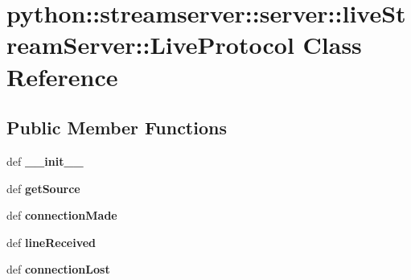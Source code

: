 \hypertarget{classpython_1_1streamserver_1_1server_1_1liveStreamServer_1_1LiveProtocol}{
\section{python::streamserver::server::liveStreamServer::LiveProtocol Class Reference}
\label{classpython_1_1streamserver_1_1server_1_1liveStreamServer_1_1LiveProtocol}
}
\subsection*{Public Member Functions}
\begin{DoxyCompactItemize}
\item 
\hypertarget{classpython_1_1streamserver_1_1server_1_1liveStreamServer_1_1LiveProtocol_a70114a4d7d6387a741fd0b2263705044}{
def {\bfseries \_\-\_\-init\_\-\_\-}}
\label{classpython_1_1streamserver_1_1server_1_1liveStreamServer_1_1LiveProtocol_a70114a4d7d6387a741fd0b2263705044}

\item 
\hypertarget{classpython_1_1streamserver_1_1server_1_1liveStreamServer_1_1LiveProtocol_aba2235e748d6a4ebf7fedcd45e5ad24d}{
def {\bfseries getSource}}
\label{classpython_1_1streamserver_1_1server_1_1liveStreamServer_1_1LiveProtocol_aba2235e748d6a4ebf7fedcd45e5ad24d}

\item 
\hypertarget{classpython_1_1streamserver_1_1server_1_1liveStreamServer_1_1LiveProtocol_a7bbb23a4a4a84fdd17c85dbdb24d9774}{
def {\bfseries connectionMade}}
\label{classpython_1_1streamserver_1_1server_1_1liveStreamServer_1_1LiveProtocol_a7bbb23a4a4a84fdd17c85dbdb24d9774}

\item 
\hypertarget{classpython_1_1streamserver_1_1server_1_1liveStreamServer_1_1LiveProtocol_a320597763f8fda88b5bf946d2a536a3d}{
def {\bfseries lineReceived}}
\label{classpython_1_1streamserver_1_1server_1_1liveStreamServer_1_1LiveProtocol_a320597763f8fda88b5bf946d2a536a3d}

\item 
\hypertarget{classpython_1_1streamserver_1_1server_1_1liveStreamServer_1_1LiveProtocol_ab6e5d4cff0750188eca6d5a2aeff0b8f}{
def {\bfseries connectionLost}}
\label{classpython_1_1streamserver_1_1server_1_1liveStreamServer_1_1LiveProtocol_ab6e5d4cff0750188eca6d5a2aeff0b8f}

\end{DoxyCompactItemize}
